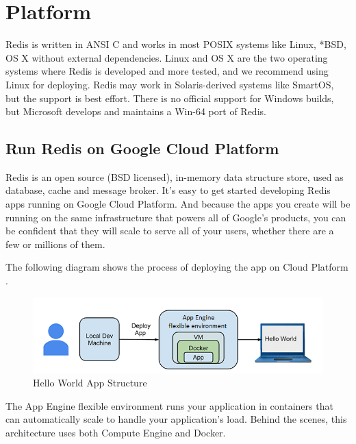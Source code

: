 \chapter{Platform}
Redis is written in ANSI C and works in most POSIX systems like Linux, *BSD, OS X without external dependencies. Linux and OS X are the two operating systems where Redis is developed and more tested, and we recommend using Linux for deploying. Redis may work in Solaris-derived systems like SmartOS, but the support is best effort. There is no official support for Windows builds, but Microsoft develops and maintains a Win-64 port of Redis.

\section{Run Redis on Google Cloud Platform}
Redis is an open source (BSD licensed), in-memory data structure store, used as database, cache and message broker.
It's easy to get started developing Redis apps running on Google Cloud Platform. And because the apps you create will be running on the same infrastructure that powers all of Google's products, you can be confident that they will scale to serve all of your users, whether there are a few or millions of them.

The following diagram shows the process of deploying the app on Cloud Platform \cite{redis_platform_google_Cloud}.

\begin{figure}[htb!]
	\centerline{\includegraphics{resources/hello-world-app-structure.png}}
	\caption{Hello World App Structure}
	\label{hello-world-app-structure}
\end{figure}
The App Engine flexible environment runs your application in containers that can automatically scale to handle your application's load. Behind the scenes, this architecture uses both Compute Engine and Docker.